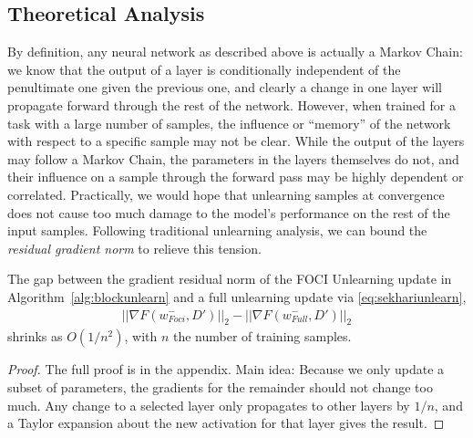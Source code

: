 \subsection{Theoretical Analysis}
By definition, any neural network as described above is actually a Markov Chain: we know that the output of a layer is conditionally independent of the penultimate one given the previous one, and clearly a change in one layer will propagate forward through the rest of the network.
However, when trained for a task with a large number of samples, the influence or ``memory'' of the network with respect to a specific sample may not be clear.
While the output of the layers may follow a Markov Chain, the parameters in the layers themselves do not, and their influence on a sample through the forward pass may be highly dependent or correlated.
Practically, we would hope that unlearning samples at convergence does not cause too much damage to the model's performance on the rest of the input samples.
Following traditional unlearning analysis, we can bound the \textit{residual gradient norm} to relieve this tension.
\begin{lemma}
The gap between the gradient residual norm of the FOCI Unlearning update in Algorithm~\ref{alg:blockunlearn} and a full unlearning update via \eqref{eq:sekhariunlearn},
\begin{align}
||\nabla F(w^-_{Foci},D')||_2 - ||\nabla F(w^-_{Full},D')||_2
\end{align}
shrinks as $O(1/n^2)$, with $n$ the number of training samples.
\end{lemma}
\begin{proof}
The full proof is in the appendix. Main idea: Because we only update a subset of parameters, the gradients for the remainder should not change too much. Any change to a selected layer only propagates to other layers by $1/n$, and a Taylor expansion about the new activation for that layer gives the result.
\end{proof}


